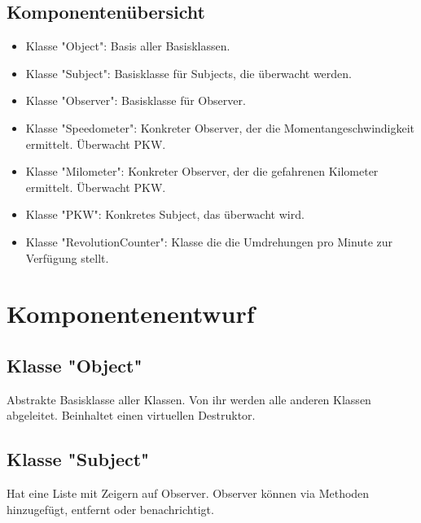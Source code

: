 \documentclass[12pt,a4paper]{article}
\begin{document}
\subsection {Komponentenübersicht}
\begin {itemize} 
	\item Klasse "Object":
	\newline
	Basis aller Basisklassen.
	
	\item Klasse "Subject":
	\newline
	Basisklasse für Subjects, die überwacht werden.
	
	\item Klasse "Observer":
	\newline
	Basisklasse für Observer.
	
	\item Klasse "Speedometer":
	\newline	
	Konkreter Observer, der die Momentangeschwindigkeit ermittelt. Überwacht PKW.
	
	\item Klasse "Milometer":
	\newline
	Konkreter Observer, der die gefahrenen Kilometer ermittelt. Überwacht PKW.
	
	\item Klasse "PKW":
	\newline
	Konkretes Subject, das überwacht wird.
	
	\item Klasse "RevolutionCounter":
	\newline
	Klasse die die Umdrehungen pro Minute zur Verfügung stellt.
		
\end {itemize}

\newpage
\section {Komponentenentwurf}
\subsection {Klasse "Object"}
Abstrakte Basisklasse aller Klassen. Von ihr werden alle anderen Klassen abgeleitet. Beinhaltet einen virtuellen Destruktor.

\subsection {Klasse "Subject"}
Hat eine Liste mit Zeigern auf Observer. Observer können via Methoden hinzugefügt, entfernt oder benachrichtigt.
\\
\end{document}
